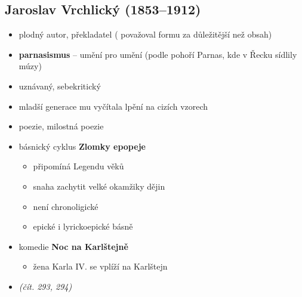 \subsection{Jaroslav Vrchlický (1853--1912)} 
\begin{itemize}
\item plodný autor, překladatel ( považoval formu za důležitější než obsah)
\item \textbf{parnasismus} -- umění pro umění (podle pohoří Parnas, kde v Řecku sídlily múzy)
\item uznávaný, sebekritický
\item mladší generace mu vyčítala lpění na cizích vzorech
\item poezie, milostná poezie
\item básnický cyklus \textbf{Zlomky epopeje}
	\begin{itemize}
	\item připomíná Legendu věků
	\item snaha zachytit velké okamžiky dějin
	\item není chronoligické 
	\item epické i lyrickoepické básně
	\end{itemize}
\item komedie \textbf{Noc na Karlštejně}
	\begin{itemize}
	\item žena Karla IV. se vplíží na Karlštejn
	\end{itemize}
\item \textit{(čít. 293, 294)}
\end{itemize}




